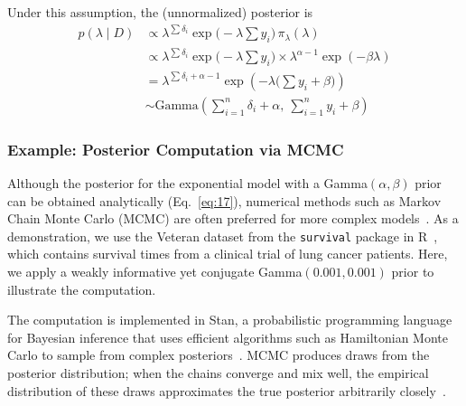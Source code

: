 Under this assumption, the (unnormalized) posterior is
\begin{align}
p(\lambda\mid D)
\label{eq:16}
&\propto \lambda^{\sum \delta_i}
\exp\Big(-\lambda \sum y_i\Big)\, \pi_\lambda(\lambda)\,\\
&\propto
\lambda^{\sum \delta_i}
\exp\Big(-\lambda \sum y_i\Big)
\times
\lambda^{\alpha - 1}
\exp(-\beta \lambda)\\
&=\lambda^{\sum \delta_i + \alpha - 1}
\exp \left( - \lambda \big(\sum y_i + \beta\big) \right) \\
&\sim
\text{Gamma}
\left(
\sum_{i=1}^{n} \delta_i + \alpha,\ \sum_{i=1}^{n} y_i + \beta
\right)
\label{eq:17}
\end{align}

\subsubsection{Example: Posterior Computation via MCMC}
Although the posterior for the exponential model with a Gamma$(\alpha,\beta)$ prior can be obtained analytically (Eq.~\ref{eq:17}), numerical methods such as Markov Chain Monte Carlo (MCMC) are often preferred for more complex models~\cite{robert2007bayesian,ibrahim2013bayesian}. As a demonstration, we use the Veteran dataset from the \texttt{survival} package in R~\cite{survival-package}, which contains survival times from a clinical trial of lung cancer patients. Here, we apply a weakly informative yet conjugate Gamma$(0.001,0.001)$ prior to illustrate the computation.

The computation is implemented in Stan, a probabilistic programming language for Bayesian inference that uses efficient algorithms such as Hamiltonian Monte Carlo to sample from complex posteriors~\cite{JSSv076i01}. MCMC produces draws from the posterior distribution; when the chains converge and mix well, the empirical distribution of these draws approximates the true posterior arbitrarily closely~\cite{https://doi.org/10.1111/2041-210X.12681}.

